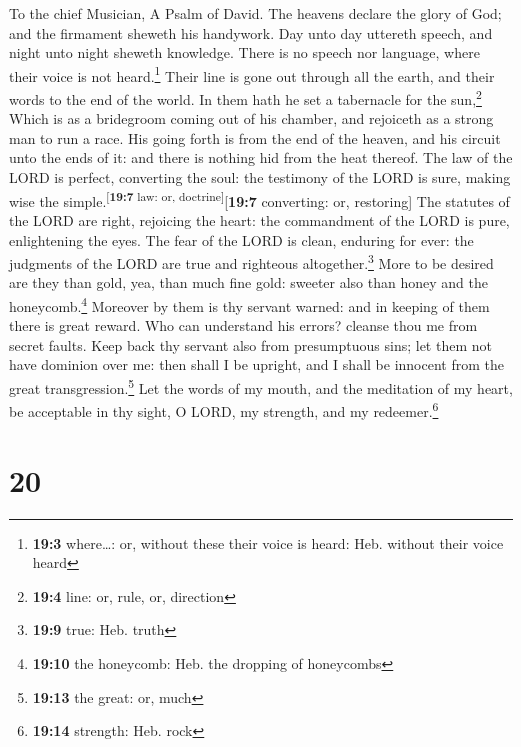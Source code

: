 To the chief Musician, A Psalm of David.  The heavens
declare the glory of God; and the firmament sheweth his handywork.
 Day unto day uttereth speech, and night unto night
sheweth knowledge.  There is no speech nor language, where
their voice is not heard.\footnote{\textbf{19:3} where\ldots: or,
  without these their voice is heard: Heb. without their voice heard}
 Their line is gone out through all the earth, and their
words to the end of the world. In them hath he set a tabernacle for the
sun,\footnote{\textbf{19:4} line: or, rule, or, direction}
 Which is as a bridegroom coming out of his chamber, and
rejoiceth as a strong man to run a race.  His going forth
is from the end of the heaven, and his circuit unto the ends of it: and
there is nothing hid from the heat thereof.  The law of
the LORD is perfect, converting the soul: the testimony of the LORD is
sure, making wise the simple.\textsuperscript{{[}\textbf{19:7} law: or,
doctrine{]}}{[}\textbf{19:7} converting: or, restoring{]} 
The statutes of the LORD are right, rejoicing the heart: the commandment
of the LORD is pure, enlightening the eyes.  The fear of
the LORD is clean, enduring for ever: the judgments of the LORD are true
and righteous altogether.\footnote{\textbf{19:9} true: Heb. truth}
 More to be desired are they than gold, yea, than much
fine gold: sweeter also than honey and the honeycomb.\footnote{\textbf{19:10}
  the honeycomb: Heb. the dropping of honeycombs} 
Moreover by them is thy servant warned: and in keeping of them there is
great reward.  Who can understand his errors? cleanse
thou me from secret faults.  Keep back thy servant also
from presumptuous sins; let them not have dominion over me: then shall I
be upright, and I shall be innocent from the great
transgression.\footnote{\textbf{19:13} the great: or, much}
 Let the words of my mouth, and the meditation of my
heart, be acceptable in thy sight, O LORD, my strength, and my
redeemer.\footnote{\textbf{19:14} strength: Heb. rock}

\hypertarget{section-19}{%
\section{20}\label{section-19}}

